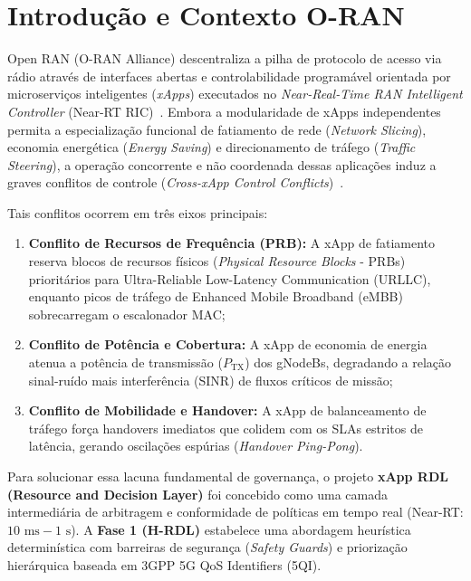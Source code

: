 \documentclass[10pt,journal,compsoc,a4paper]{IEEEtran}
\begin{document}
\maketitle
\IEEEdisplaynontitleabstractindextext
\IEEEpeerreviewmaketitle

\section{Introdução e Contexto O-RAN}
 Open RAN (O-RAN Alliance) descentraliza a pilha de protocolo de acesso via rádio através de interfaces abertas e controlabilidade programável orientada por microserviços inteligentes (\textit{xApps}) executados no \textit{Near-Real-Time RAN Intelligent Controller} (Near-RT RIC)~\cite{oran_wg1, oran_wg3}. Embora a modularidade de xApps independentes permita a especialização funcional de fatiamento de rede (\textit{Network Slicing}), economia energética (\textit{Energy Saving}) e direcionamento de tráfego (\textit{Traffic Steering}), a operação concorrente e não coordenada dessas aplicações induz a graves conflitos de controle (\textit{Cross-xApp Control Conflicts})~\cite{bonati2021openran, polese2023understanding}.

Tais conflitos ocorrem em três eixos principais:
\begin{enumerate}
    \item \textbf{Conflito de Recursos de Frequência (PRB):} A xApp de fatiamento reserva blocos de recursos físicos (\textit{Physical Resource Blocks} - PRBs) prioritários para Ultra-Reliable Low-Latency Communication (URLLC), enquanto picos de tráfego de Enhanced Mobile Broadband (eMBB) sobrecarregam o escalonador MAC;
    \item \textbf{Conflito de Potência e Cobertura:} A xApp de economia de energia atenua a potência de transmissão ($P_{\text{TX}}$) dos gNodeBs, degradando a relação sinal-ruído mais interferência (SINR) de fluxos críticos de missão;
    \item \textbf{Conflito de Mobilidade e Handover:} A xApp de balanceamento de tráfego força handovers imediatos que colidem com os SLAs estritos de latência, gerando oscilações espúrias (\textit{Handover Ping-Pong}).
\end{enumerate}

Para solucionar essa lacuna fundamental de governança, o projeto \textbf{xApp RDL (Resource and Decision Layer)} foi concebido como uma camada intermediária de arbitragem e conformidade de políticas em tempo real (Near-RT: $10\text{ ms} - 1\text{ s}$). A \textbf{Fase 1 (H-RDL)} estabelece uma abordagem heurística determinística com barreiras de segurança (\textit{Safety Guards}) e priorização hierárquica baseada em 3GPP 5G QoS Identifiers (5QI).
\end{document}
